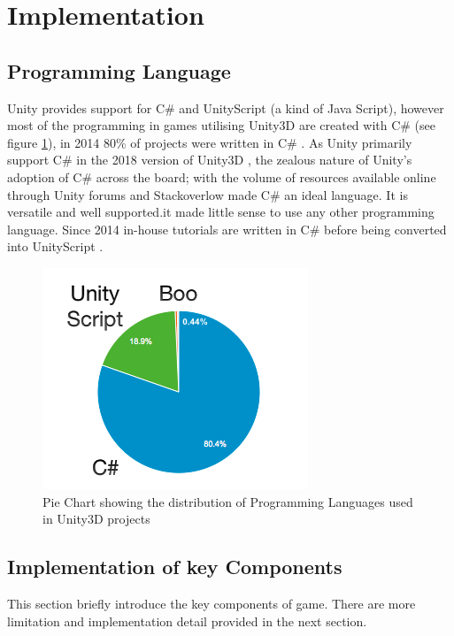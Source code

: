 \documentclass[12pt]{article}
\begin{document}
\section{Implementation}

\subsection{Programming Language} \label{unitylanguage}
Unity provides support for C\# and UnityScript (a kind of Java Script), however most of the programming in games utilising Unity3D are created with C\# (see figure \ref{fig:piechart}), in 2014 80\% of projects were written in C\# \cite{unityblog}. As Unity primarily support C\# in the 2018 version of Unity3D \cite{unityprogramming}, the zealous nature of Unity's adoption of C\# across the board; with the volume of resources available online through Unity forums and Stackoverlow made C\# an ideal language. It is versatile and well supported.it made little sense to use any other programming language. Since 2014 in-house tutorials are written in C\# before being converted into UnityScript \cite{unityblog}. 

\begin{figure}[H]
\centering
\includegraphics{graph3.png}
\caption[Pie Chart Showing the Distribution of Programming Languages Used in Unity3D Projects]{Pie Chart showing the distribution of Programming Languages used in Unity3D projects \cite{unityblog}}
\label{fig:piechart}
\end{figure}



\subsection{Implementation of key Components}
This section briefly introduce the key components of game. There are more limitation and implementation detail provided in the next section.
\end{document}
